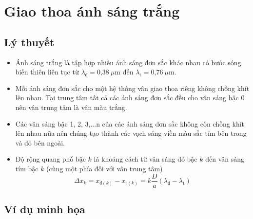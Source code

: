 
\chapter[Giao thoa ánh sáng trắng]{Giao thoa ánh sáng trắng}

\section{Lý thuyết}

\begin{itemize}
	
	\item Ánh sáng trắng là tập hợp  nhiều ánh sáng đơn sắc khác nhau có bước sóng biến thiên liên tục từ  $\lambda_{\text{đ}} =\text{0,38}\ \mu \text{m}$  đến $\lambda_{\text{t}} =\text{0,76}\ \mu \text{m}$.
	
	\item Mỗi ánh sáng đơn sắc cho một hệ thống vân giao thoa riêng không chồng khít lên nhau. Tại trung tâm tất cả các ánh sáng đơn sắc đều cho vân sáng bậc 0 nên vân trung tâm là vân màu trắng.
	
	\item Các vân sáng bậc 1, 2, 3,...n của các ánh sáng đơn sắc không còn chồng khít lên nhau nữa nên chúng tạo thành các vạch sáng viền màu sắc tím bên trong và đỏ bên ngoài.
	\item Độ rộng quang phổ bậc $k$ là khoảng cách từ vân sáng đỏ bậc $k$ đến vân sáng tím bậc $k$ (cùng một phía đối với vân trung tâm)
	\begin{equation}
		\Delta x_{k} = x_{\text{đ}(k)}-x_{\text{t}(k)}=k\dfrac{D}{a}(\lambda_\text{đ}-\lambda_\text{t})
	\end{equation}
\end{itemize}

\section{Ví dụ minh họa}


